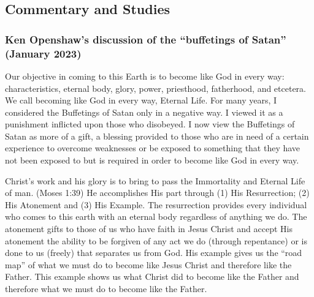 	
	
\subsection{Commentary and Studies} %
	\label{BUFFET-COMMENTARY}

	
		
	\subsubsection{Ken Openshaw's discussion of the ``buffetings of Satan'' (January 2023)}
		\label{BUFFET-openshaw}
		
		Our objective in coming to this Earth is to become like God in every way: characteristics, eternal body, glory, power, priesthood, fatherhood, and etcetera. We call becoming like God in every way, Eternal Life. For many years, I considered the Buffetings of Satan only in a negative way. I viewed it as a punishment inflicted upon those who disobeyed. I now view the Buffetings of Satan as more of a gift, a blessing provided to those who are in need of a certain experience to overcome weaknesses or be exposed to something that they have not been exposed to but is required in order to become like God in every way. 

		Christ's work and his glory is to bring to pass the Immortality and Eternal Life of man. (Moses 1:39) He accomplishes His part through (1) His Resurrection; (2) His Atonement and (3) His Example. The resurrection provides every individual who comes to this earth with an eternal body regardless of anything we do. The atonement gifts to those of us who have faith in Jesus Christ and accept His atonement the ability to be forgiven of any act we do (through repentance) or is done to us (freely) that separates us from God. His example gives us the ``road map'' of what we must do to become like Jesus Christ and therefore like the Father. This example shows us what Christ did to become like the Father and therefore what we must do to become like the Father.

